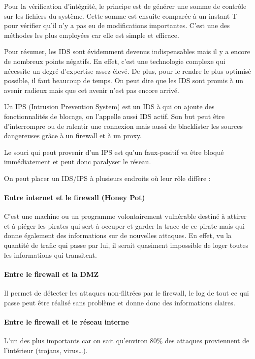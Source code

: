 \documentclass[a4paper,11pt,french]{article}
\begin{document}
Pour la vérification d’intégrité, le principe est de générer une somme de contrôle sur les fichiers du système. Cette somme est ensuite comparée à un instant T pour vérifier qu’il n’y a pas eu de modifications importantes. C’est une des méthodes les plus employées car elle est simple et efficace.


Pour résumer, les IDS sont évidemment devenus indispensables mais il y a encore de nombreux points négatifs.
En effet, c’est une technologie complexe qui nécessite un degré d’expertise assez élevé.
De plus, pour le rendre le plus optimisé possible, il faut beaucoup de temps.
On peut dire que les IDS sont promis à un avenir radieux mais que cet avenir n’est pas encore arrivé.


Un IPS (Intrusion Prevention System) est un IDS à qui on ajoute des fonctionnalités de blocage, on l’appelle aussi IDS actif.
Son but peut être d'interrompre ou de ralentir une connexion mais aussi de blacklister les sources dangereuses grâce à un firewall et à un proxy.


Le souci qui peut provenir d’un IPS est qu’un faux-positif va être bloqué immédiatement et peut donc paralyser le réseau.


On peut placer un IDS/IPS à plusieurs endroits où leur rôle diffère :
\paragraph{Entre internet et le firewall (Honey Pot)}
C’est une machine ou un programme volontairement vulnérable destiné à attirer et à piéger les pirates qui sert à occuper et garder la trace de ce pirate mais qui donne également des informations sur de nouvelles attaques. En effet, vu la quantité de trafic qui passe par lui, il serait quasiment impossible de loger toutes les informations qui transitent.
\paragraph{Entre le firewall et la DMZ}
Il permet de détecter les attaques non-filtrées par le firewall, le log de tout ce qui passe peut être réalisé sans problème et donne donc des informations claires.
\paragraph{Entre le firewall et le réseau interne} L’un des plus importants car on sait qu’environ 80\% des attaques proviennent de l’intérieur (trojans, virus…).
\end{document}
